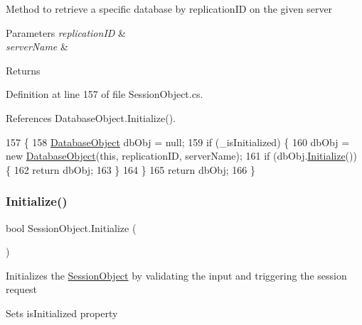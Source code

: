 Method to retrieve a specific database by replication\+ID on the given server 


\begin{DoxyParams}{Parameters}
{\em replication\+ID} & \\
\hline
{\em server\+Name} & \\
\hline
\end{DoxyParams}
\begin{DoxyReturn}{Returns}

\end{DoxyReturn}


Definition at line 157 of file Session\+Object.\+cs.



References Database\+Object.\+Initialize().


\begin{DoxyCode}
157                                                                                    \{
158         \hyperlink{class_database_object}{DatabaseObject} dbObj = null;
159         \textcolor{keywordflow}{if} (\_isInitialized) \{
160             dbObj = \textcolor{keyword}{new} \hyperlink{class_database_object}{DatabaseObject}(\textcolor{keyword}{this}, replicationID, serverName);
161             \textcolor{keywordflow}{if} (dbObj.\hyperlink{class_database_object_a7de43a21bd287deec537cffec343f41d}{Initialize}()) \{
162                 \textcolor{keywordflow}{return} dbObj;
163             \}
164         \}
165         \textcolor{keywordflow}{return} dbObj;
166     \}
\end{DoxyCode}
\mbox{\label{class_session_object_af3b9c9d56d98c848061952ed935f815b}} 
\subsubsection{\texorpdfstring{Initialize()}{Initialize()}}
{\footnotesize\ttfamily bool Session\+Object.\+Initialize (\begin{DoxyParamCaption}{ }\end{DoxyParamCaption})}



Initializes the \hyperlink{class_session_object}{Session\+Object} by validating the input and triggering the session request 

Sets is\+Initialized property

